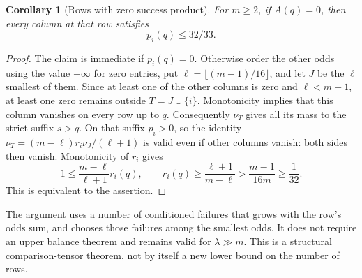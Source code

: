 \documentclass[11pt]{article}
\newtheorem{corollary}{Corollary}
\begin{document}
\begin{corollary}[Rows with zero success product]
For $m\ge2$, if $A(q)=0$, then every column at that row satisfies
\[
 p_i(q)\le32/33.
\]
\end{corollary}
\begin{proof}
The claim is immediate if $p_i(q)=0$. Otherwise order the other odds
using the value $+\infty$ for zero entries, put
$\ell=\lfloor(m-1)/16\rfloor$, and let $J$ be the $\ell$ smallest of
them. Since at least one of the other columns is zero and
$\ell<m-1$, at least one zero remains outside $T=J\cup\{i\}$.
Monotonicity implies that this column vanishes on every row up to $q$.
Consequently $\nu_T$ gives all its mass to the strict suffix $s>q$.
On that suffix $p_i>0$, so the identity
$\nu_T=(m-\ell)r_i\nu_J/(\ell+1)$ is valid even if other columns
vanish: both sides then vanish. Monotonicity of $r_i$ gives
\[
 1\le\frac{m-\ell}{\ell+1}r_i(q),\qquad
 r_i(q)\ge\frac{\ell+1}{m-\ell}
 >\frac{m-1}{16m}\ge\frac1{32}.
\]
This is equivalent to the assertion.
\end{proof}

The argument uses a number of conditioned failures that grows with the
row's odds sum, and chooses those failures among the smallest odds.
It does not require an upper balance theorem and remains valid for
$\lambda\gg m$. This is a structural comparison-tensor theorem, not
by itself a new lower bound on the number of rows.
\end{document}
